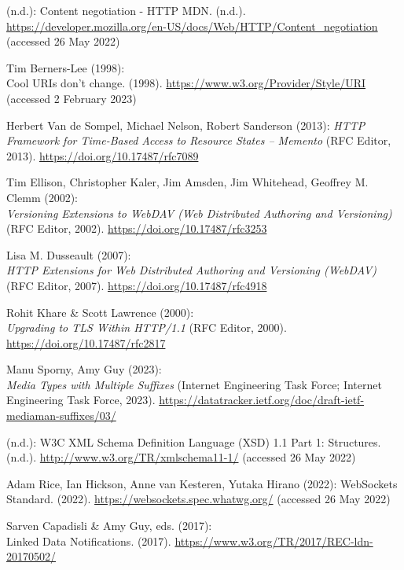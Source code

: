 \begin{thebibliography}{9}
(n.d.): Content negotiation - {HTTP} \textbar{} {MDN}. (n.d.).
\url{https://developer.mozilla.org/en-US/docs/Web/HTTP/Content_negotiation}
(accessed 26 May 2022)

Tim Berners-Lee (1998): \\
Cool {URIs} don't change. (1998).
\url{https://www.w3.org/Provider/Style/URI} (accessed 2 February 2023)

Herbert Van de Sompel, Michael Nelson, Robert Sanderson (2013):
\emph{{HTTP Framework} for {Time-Based Access} to {Resource States} --
{Memento}} ({RFC Editor}, 2013).
\url{https://doi.org/10.17487/rfc7089}

Tim Ellison, Christopher Kaler, Jim Amsden, Jim Whitehead, Geoffrey
M. Clemm (2002): \\
\emph{Versioning {Extensions} to {WebDAV} ({Web
Distributed Authoring} and {Versioning})} ({RFC Editor}, 2002).
\url{https://doi.org/10.17487/rfc3253}

Lisa M. Dusseault (2007): \\
\emph{{HTTP Extensions} for {Web Distributed
Authoring} and {Versioning} ({WebDAV})} ({RFC Editor}, 2007).
\url{https://doi.org/10.17487/rfc4918}

Rohit Khare \& Scott Lawrence (2000): \\
\emph{Upgrading to {TLS Within
HTTP}/1.1} ({RFC Editor}, 2000).
\url{https://doi.org/10.17487/rfc2817}

Manu Sporny, Amy Guy (2023): \\
\emph{{Media Types with Multiple
Suffixes}} (Internet Engineering Task Force; Internet Engineering Task
Force, 2023).
\url{https://datatracker.ietf.org/doc/draft-ietf-mediaman-suffixes/03/}

(n.d.): {W3C XML Schema Definition Language} ({XSD}) 1.1 {Part} 1:
{Structures}. (n.d.). \url{http://www.w3.org/TR/xmlschema11-1/}
(accessed 26 May 2022)

Adam Rice, Ian Hickson, Anne van Kesteren, Yutaka Hirano (2022):
{WebSockets Standard}. (2022). \url{https://websockets.spec.whatwg.org/}
(accessed 26 May 2022)

Sarven Capadisli \& Amy Guy, eds. (2017): \\
Linked {Data Notifications}.
(2017). \url{https://www.w3.org/TR/2017/REC-ldn-20170502/}


\end{thebibliography}
